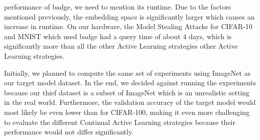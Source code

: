 performance of \gls{badge}, we need to mention its runtime. Due to the factors mentioned previously, the embedding space is significantly larger which causes
an increase in runtime. On our hardware, the Model Stealing Attacks for CIFAR-10 and MNIST which used \gls{badge} had a query time of about 4 days, which is
significantly more than all the other Active Learning strategies other Active Learning strategies. \par
Initially, we planned to compute the same set of experiments using ImageNet as our target model dataset. In the end, we decided against running the experiments
because our thief dataset is a subset of ImageNet which is an unrealistic setting in the real world. Furthermore, the validation accuracy of the target model
would most likely be even lower than for CIFAR-100, making it even more challenging to evaluate the different Continual Active Learning strategies because their
performance would not differ significantly.

